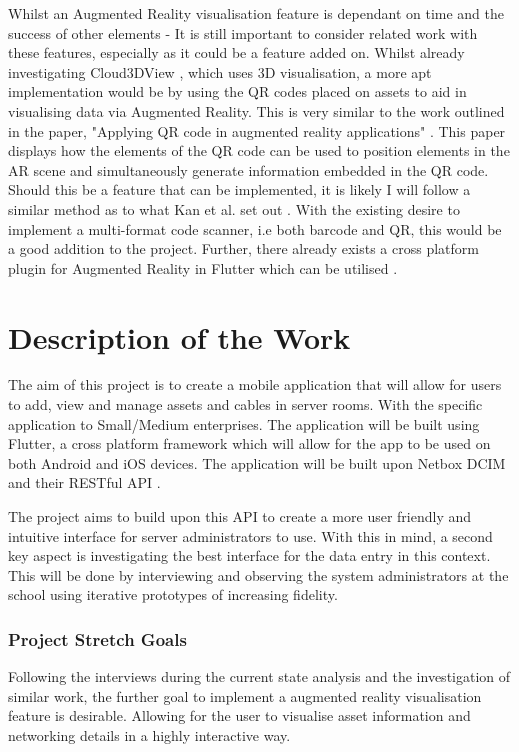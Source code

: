 \documentclass [12pt,letterpaper]{article}
\begin{document}
Whilst an Augmented Reality visualisation feature is dependant on time and the success of other elements - It is still important to consider related work with these features, especially as it could be a feature added on. Whilst already investigating Cloud3DView \cite{cloud3dview}, which uses 3D visualisation, a more apt implementation would be by using the QR codes placed on assets to aid in visualising data via Augmented Reality. This is very similar to the work outlined in the paper, "Applying QR code in augmented reality applications" \cite{applyingQR}. This paper displays how the elements of the QR code can be used to position elements in the AR scene and simultaneously generate information embedded in the QR code. Should this be a feature that can be implemented, it is likely I will follow a similar method as to what Kan et al. set out \cite{applyingQR}. With the existing desire to implement a multi-format code scanner, i.e both barcode and QR, this would be a good addition to the project. Further, there already exists a cross platform plugin for Augmented Reality in Flutter which can be utilised \cite{ar_flutter}.

\section{Description of the Work}
\label{sec:work}
The aim of this project is to create a mobile application that will allow for users to add, view and manage assets and cables in server rooms. With the specific application to Small/Medium enterprises. The application will be built using Flutter, a cross platform framework which will allow for the app to be used on both Android and iOS devices. The application will be built upon Netbox DCIM \cite{Netbox} and their RESTful API \cite{NetboxAPI}. 

The project aims to build upon this API to create a more user friendly and intuitive interface for server administrators to use. With this in mind, a second key aspect is investigating the best interface for the data entry in this context. This will be done by interviewing and observing the system administrators at the school using iterative prototypes of increasing fidelity.

\subsubsection{Project Stretch Goals}
\label{sec:stretchgoals}
Following the interviews during the current state analysis and the investigation of similar work, the further goal to implement a augmented reality visualisation feature is desirable. Allowing for the user to visualise asset information and networking details in a highly interactive way. 
\end{document}

